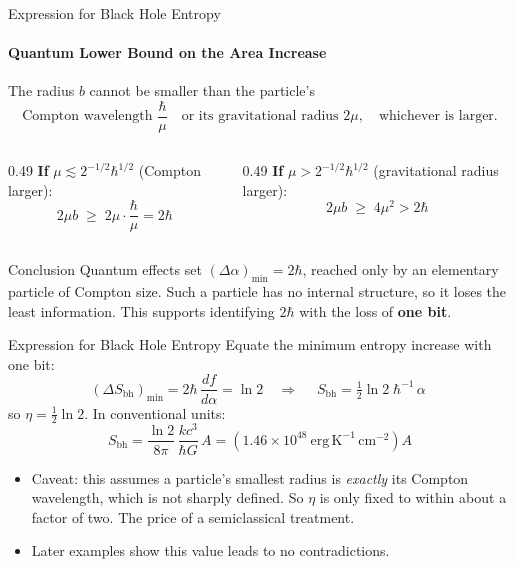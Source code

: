 \documentclass[aspectratio=169]{beamer}
\begin{document}
\begin{frame}{Expression for Black Hole Entropy}
\framesubtitle{Quantum Lower Bound on the Area Increase}
The radius $b$ cannot be smaller than the particle's
\[
  \text{Compton wavelength } \frac{\hbar}{\mu}
  \quad\text{or its gravitational radius } 2\mu,
  \quad\text{whichever is larger.}
\]
\begin{columns}[T]
\begin{column}{0.49\textwidth}
\textbf{If} $\mu \lesssim 2^{-1/2}\hbar^{1/2}$ (Compton larger):
\[
  2\mu b \;\ge\; 2\mu\cdot\frac{\hbar}{\mu} = 2\hbar
\]
\end{column}
\begin{column}{0.49\textwidth}
\textbf{If} $\mu > 2^{-1/2}\hbar^{1/2}$ (gravitational radius larger):
\[
  2\mu b \;\ge\; 4\mu^{2} > 2\hbar
\]
\end{column}
\end{columns}
\vspace{4pt}
\begin{block}{Conclusion}
Quantum effects set $(\Delta\alpha)_{\min} = 2\hbar$, reached only by an elementary particle of Compton size. Such a particle has no internal structure, so it loses the least information. This supports identifying $2\hbar$ with the loss of \textbf{one bit}.
\end{block}
\end{frame}

\begin{frame}{Expression for Black Hole Entropy}
Equate the minimum entropy increase with one bit:
\[
  (\Delta S_{\text{bh}})_{\min} = 2\hbar\,\frac{df}{d\alpha} = \ln 2
  \quad\Longrightarrow\quad
  \boxed{\;S_{\text{bh}} = \tfrac12\ln 2\;\hbar^{-1}\,\alpha\;}
\]
so $\eta = \tfrac12 \ln 2$. In conventional units:
\[
  S_{\text{bh}} = \frac{\ln 2}{8\pi}\,\frac{k c^{3}}{\hbar G}\,A
  = \left(1.46\times10^{48}\ \mathrm{erg\,K^{-1}\,cm^{-2}}\right)A
\]
\begin{itemize}
  \item Caveat: this assumes a particle's smallest radius is \emph{exactly} its Compton wavelength, which is not sharply defined. So $\eta$ is only fixed to within about a factor of two. The price of a semiclassical treatment.
  \item Later examples show this value leads to no contradictions.
\end{itemize}
\end{frame}
\end{document}
